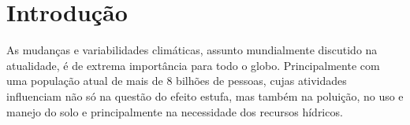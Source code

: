 \documentclass[fleqn]{icat-ufal}
\newcommand{\BibTeX}   {\textsc{Bib}\TeX}
\begin{document}
\chapter{Introdução}
\label{cap:introducao}






As mudanças e variabilidades climáticas, assunto mundialmente discutido na atualidade, é de extrema importância para todo o globo. Principalmente com uma população atual de mais de 8 bilhões de pessoas, cujas atividades influenciam não só na questão do efeito estufa, mas também na poluição, no uso e manejo do solo e principalmente na necessidade dos recursos hídricos.
\end{document}
